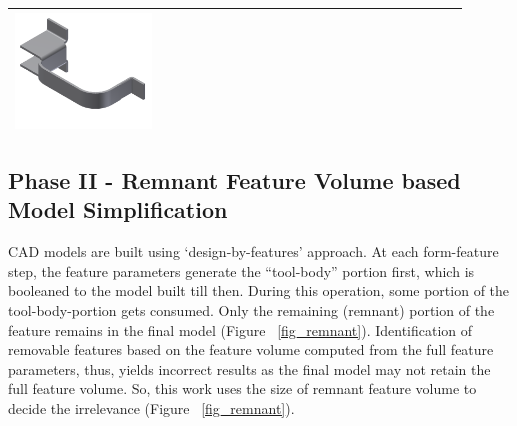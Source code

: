 \begin{minipage}[t]{0.9\linewidth}
\begin{tabular}[h]{@{} p{0.3\linewidth} | p{0.3\linewidth} | p{0.3\linewidth}@{}}
\includegraphics[width=0.98\linewidth]{..//Common/images/DefeatBracketPhase_I_3} \\ \bottomrule

\end{tabular}
\label{fig:phaseI}
\end{minipage}

\subsection{Phase II - Remnant Feature Volume based Model Simplification} \label{ph2}
CAD models are built using `design-by-features' approach. At each form-feature step, the feature parameters generate the ``tool-body'' portion first, which is booleaned to the model built till then. During this operation, some portion of the tool-body-portion gets consumed. Only the remaining (remnant) portion of the feature remains in the final model (Figure ~\ref{fig_remnant}). Identification of removable features based on the feature volume computed from the full feature parameters, thus, yields incorrect results \cite{Russ2012} as the final model may not retain the full feature volume. So, this work uses the size of remnant feature volume to decide the irrelevance (Figure ~\ref{fig_remnant}).

